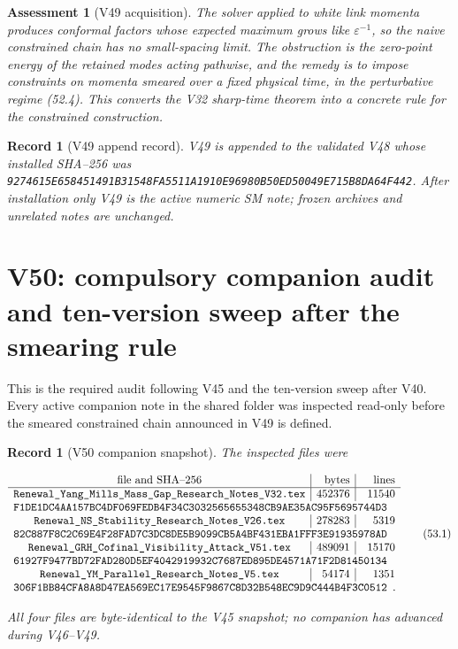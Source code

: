 \documentclass[11pt]{article}
\newtheorem{assessment}[theorem]{Assessment}
\newtheorem{record}[theorem]{Record}
\theoremstyle{remark}
\begin{document}
\begin{assessment}[V49 acquisition]
\label{ass:v19v49}
The solver applied to white link momenta produces conformal factors
whose expected maximum grows like \(\varepsilon^{-1}\), so the naive
constrained chain has no small-spacing limit.  The obstruction is the
zero-point energy of the retained modes acting pathwise, and the
remedy is to impose constraints on momenta smeared over a fixed
physical time, in the perturbative regime (52.4).  This converts the
V32 sharp-time theorem into a concrete rule for the constrained
construction.
\end{assessment}

\begin{record}[V49 append record]
\label{rec:v19v49}
V49 is appended to the validated V48 whose installed SHA--256 was
\texttt{9274615E658451491B31548FA5511A1910E96980B50ED50049E715B8DA64F442}.
After installation only V49 is the active numeric SM note; frozen
archives and unrelated notes are unchanged.
\end{record}


\section{V50: compulsory companion audit and ten-version sweep after the smearing rule}
\label{sec:v19v50}

This is the required audit following V45 and the ten-version sweep
after V40.  Every active companion note in the shared folder was
inspected read-only before the smeared constrained chain announced in
V49 is defined.

\begin{record}[V50 companion snapshot]
\label{rec:v19v50-snapshot}
The inspected files were

\[
\begin{array}{c|r|r}
\hbox{file and SHA--256}&\hbox{bytes}&\hbox{lines}\\ \hline
\texttt{Renewal\_Yang\_Mills\_Mass\_Gap\_Research\_Notes\_V32.tex}
&452376&11540\\
\multicolumn{3}{l}{
\texttt{F1DE1DC4AA157BC4DF069FEDB4F34C3032565655348CB9AE35AC95F5695744D3}}
\\
\texttt{Renewal\_NS\_Stability\_Research\_Notes\_V26.tex}
&278283&5319\\
\multicolumn{3}{l}{
\texttt{82C887F8C2C69E4F28FAD7C3DC8DE5B9099CB5A4BF431EBA1FFF3E91935978AD}}
\\
\texttt{Renewal\_GRH\_Cofinal\_Visibility\_Attack\_V51.tex}
&489091&15170\\
\multicolumn{3}{l}{
\texttt{61927F9477BD72FAD280D5EF4042919932C7687ED895DE4571A71F2D81450134}}
\\
\texttt{Renewal\_YM\_Parallel\_Research\_Notes\_V5.tex}
&54174&1351\\
\multicolumn{3}{l}{
\texttt{306F1BB84CFA8A8D47EA569EC17E9545F9867C8D32B548EC9D9C444B4F3C0512}}.
\end{array}                                                     \tag{53.1}
\]

All four files are byte-identical to the V45 snapshot; no companion
has advanced during V46--V49.
\end{record}
\end{document}
